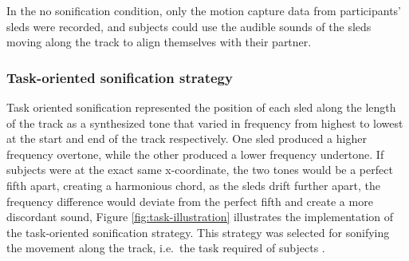 \documentclass[10pt,a4paper,onecolumn]{article}
\begin{document}
In the no sonification condition, only the motion capture data from participants' sleds were recorded, and subjects could use the audible sounds of the sleds moving along the track to align themselves with their partner.

\hypertarget{task-oriented-sonification-strategy}{%
\subsubsection{Task-oriented sonification strategy}\label{task-oriented-sonification-strategy}}

Task oriented sonification represented the position of each sled along the length of the track as a synthesized tone that varied in frequency from highest to lowest at the start and end of the track respectively. One sled produced a higher frequency overtone, while the other produced a lower frequency undertone. If subjects were at the exact same x-coordinate, the two tones would be a perfect fifth apart, creating a harmonious chord, as the sleds drift further apart, the frequency difference would deviate from the perfect fifth and create a more discordant sound, Figure \ref{fig:task-illustration} illustrates the implementation of the task-oriented sonification strategy. This strategy was selected for sonifying the movement along the track, i.e.~the task required of subjects .
\end{document}
